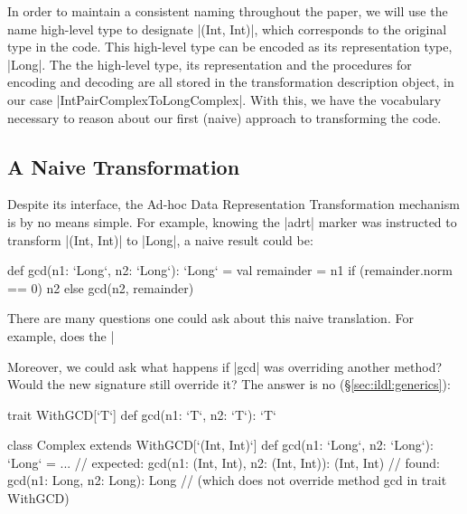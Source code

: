In order to maintain a consistent naming throughout the paper, we will use the name high-level type to designate |(Int, Int)|, which corresponds to the original type in the code. This high-level type can be encoded as its representation type, |Long|. The the high-level type, its representation and the procedures for encoding and decoding are all stored in the transformation description object, in our case |IntPairComplexToLongComplex|. With this, we have the vocabulary necessary to reason about our first (naive) approach to transforming the code.

\subsection{A Naive Transformation}

Despite its interface, the Ad-hoc Data Representation Transformation mechanism is by no means simple. For example, knowing the |adrt| marker was instructed to transform |(Int, Int)| to |Long|, a naive result could be:

\begin{lstlisting-nobreak}
def gcd(n1: `Long`, n2: `Long`): `Long` = {
  val remainder = n1 %
  if (remainder.norm == 0) n2 else gcd(n2, remainder)
}
\end{lstlisting-nobreak}

There are many questions one could ask about this naive translation. For example, does the |%

Moreover, we could ask what happens if |gcd| was overriding another method? Would the new signature still override it? The answer is no (\S\ref{sec:ildl:generics}):

\begin{lstlisting-nobreak}
trait WithGCD[`T`] {
  def gcd(n1: `T`, n2: `T`): `T`
}

class Complex extends WithGCD[`(Int, Int)`] {
  def gcd(n1: `Long`, n2: `Long`): `Long` = ...
  // expected: gcd(n1: (Int, Int), n2: (Int, Int)): (Int, Int)
  // found:    gcd(n1: Long, n2: Long): Long
  // (which does not override method gcd in trait WithGCD)
}
\end{lstlisting-nobreak}
%

